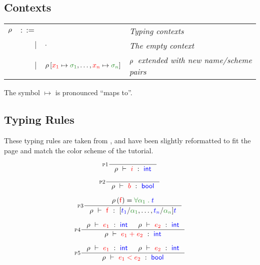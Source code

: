 \documentclass[a4paper]{article}
\makeatletter
\def\grammar#1#2{%
  \vspace{1em}
  \begin{tabular}{r@{$\quad$}r@{$\quad$}l@{$\qquad$}l}
  $#1$ & $::=$ & & \emph{#2}\\
}
\def\endgrammar{\end{tabular}\vspace{1em}}
\def\prod#1#2{&$\mid$&$#1$&\emph{#2}}
\newcommand{\RULE}[1]{\textsc{#1}}
\newcommand{\expr}[1]{\ensuremath{\textcolor{term}{#1}}}
\newcommand{\type}[1]{\ensuremath{\textcolor{blue}{#1}}}
\newcommand{\context}[1]{\ensuremath{\textcolor{black}{#1}}}
\newcommand{\scheme}[1]{\ensuremath{\textcolor{ForestGreen}{#1}}}
\newcommand{\const}[1]{\mathsf{#1}}
\newcommand{\typing}[3]{\ensuremath{#1\ \vdash\ #2\ :\ #3}}
\newcommand{\TRUE}{\ensuremath{\expr{\const{true}}}}
\newcommand{\FALSE}{\ensuremath{\expr{\const{false}}}}
\newcommand{\PLUS}[2]{#1\;\expr{+}\;#2}
\newcommand{\LT}[2]{#1\;\expr{<}\;#2}
\newcommand\var[1]{\ensuremath{\expr{\mathsf{#1}}}}
\newcommand\INT{\type{\const{int}}}
\newcommand\BOOL{\type{\const{bool}}}
\newcommand\FORALL[2]{\scheme{\forall #1\;.\;#2}}
\newcommand{\EMPTY}{\context{\cdot}}
\newcommand{\WITH}[2]{\context{#1\left[#2\right]}}
\newcommand{\RHO}{\context{\rho}}
\newcommand{\LOOKUP}[2]{#1\left(#2\right)}
\makeatother
\begin{document}
\subsection*{Contexts}
\grammar{\RHO}{Typing contexts}
\prod{\EMPTY}{The empty context}\\
\prod{\WITH{\RHO}{\expr{x_1} \mapsto \scheme{\sigma_1}, \ldots, \expr{x_n} \mapsto \scheme{\sigma_n}}}{\RHO\ extended with new name/scheme pairs}
\endgrammar

The symbol $\mapsto$ is pronounced ``maps to''.

\subsection*{Typing Rules}
These typing rules are taken from \citet[p. 98]{Sestoft2012}, and have been
slightly reformatted to fit the page and match the color scheme of the
tutorial.

\begin{displaymath}
  \inference[\RULE{p1}]{}{
    \typing{\RHO}{\textcolor{term}{i}}{\INT}
  }
\end{displaymath}

\begin{displaymath}
  \inference[\RULE{p2}]{}{
    \typing{\RHO}{\textcolor{term}{b}}{\BOOL}
  }
\end{displaymath}



\begin{displaymath}
  \inference[\RULE{p3}]{
    \LOOKUP{\RHO}{\var{f}} = \FORALL{\alpha_1}{\type{t}}
  }{
    \typing{\RHO}{\var{f}}{
      [\type{t_1}/\scheme{\alpha_1}, \ldots, \type{t_n}/\scheme{\alpha_n}]\type{t}
    }
  }
\end{displaymath}

\begin{displaymath}
  \inference[\RULE{p4}]{
    \typing{\RHO}{\expr{e_1}}{\INT} &
    \typing{\RHO}{\expr{e_2}}{\INT}
  }{
    \typing{\RHO}{\PLUS{\expr{e_1}}{\expr{e_2}}}{\INT}
  }
\end{displaymath}

\begin{displaymath}
  \inference[\RULE{p5}]{
    \typing{\RHO}{\expr{e_1}}{\INT} &
    \typing{\RHO}{\expr{e_2}}{\INT}
  }{
    \typing{\RHO}{\LT{\expr{e_1}}{\expr{e_2}}}{\BOOL}
  }
\end{displaymath}
\end{document}
